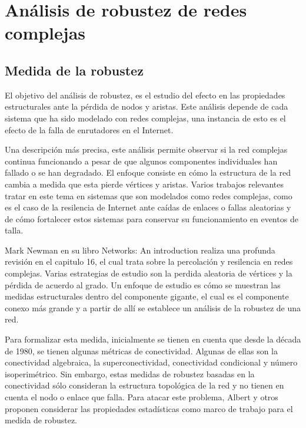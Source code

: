 \section{Análisis de robustez de redes complejas}

\subsection{Medida de la robustez}

El objetivo del análisis de robustez, es el estudio del efecto en las propiedades estructurales ante la pérdida de nodos y aristas\cite{Albert2000}. Este análisis depende de cada sistema que ha sido modelado con redes complejas, una instancia de esto es el efecto de la falla de enrutadores en el Internet.

Una descripción más precisa, este análisis permite observar si la red complejas continua funcionando a pesar de que algunos componentes individuales han fallado o se han degradado. El enfoque consiste en cómo la estructura de la red cambia a medida que esta pierde vértices y aristas. Varios trabajos relevantes tratar en este tema en sistemas que son modelados como redes complejas, como es el caso de la resilencia de Internet ante caídas de enlaces o fallas aleatorias\cite{Cohen2000} y de cómo fortalecer estos sistemas para conservar su funcionamiento en eventos de talla\cite{Cohen2003}.

Mark Newman en su libro Networks: An introduction\cite{Newman2010} realiza una profunda revisión en el capitulo 16, el cual trata sobre la percolación y resilencia en redes complejas. Varias estrategias de estudio son la perdida aleatoria de vértices y la pérdida de acuerdo al grado. Un enfoque de estudio es cómo se muestran las medidas estructurales dentro del componente gigante, el cual es el componente conexo más grande y a partir de allí se establece un análisis de la robustez de una red.

Para formalizar esta medida, inicialmente se tienen en cuenta que desde la década de 1980, se tienen algunas métricas de conectividad. Algunas de ellas son la conectividad algebraica\cite{Fiedler1973}, la superconectividad\cite{Bauer1985}, conectividad condicional\cite{Harary1983} y número isoperimétrico\cite{Mohar1989}. Sin embargo, estas medidas de robustez basadas en la conectividad sólo consideran la estructura topológica de la red y no tienen en cuenta el nodo o enlace que falla. Para atacar este problema, Albert y otros\cite{Albert2000} proponen considerar las propiedades estadísticas como marco de trabajo para el medida de robustez. 

